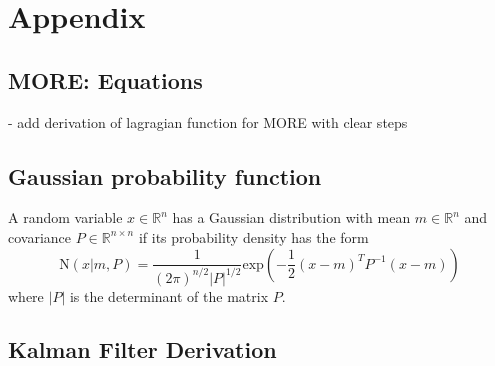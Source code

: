 
\chapter{Appendix}

\section{MORE: Equations}\label{more_appendix}
- add derivation of lagragian function for MORE with clear
steps


\section{Gaussian probability function}\label{gauss_pdf}
A random variable $x \in \mathbb{R}^n$ has a Gaussian distribution with mean
$m \in \mathbb{R}^n$ and covariance $P \in \mathbb{R}^{n\times n}$ if its
probability density has the form
$$ \text{N}(x | m, P) = \frac{1}{(2\pi)^{n / 2} |P|^{1/2}}
\text{exp} \left( -\frac{1}{2} (x - m)^T P^{-1} (x-m) \right) $$
where $|P|$ is the determinant of the matrix $P$.

\section{Kalman Filter Derivation} \label{KF_appendix}
